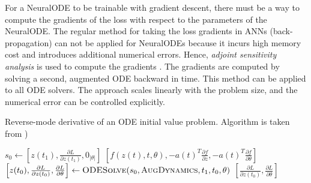 For a \gls{NeuralODE} to be trainable with gradient descent, there must be a way to compute the gradients of the loss with respect to the parameters of the \gls{NeuralODE}.
The regular method for taking the loss gradients in \glspl{ANN} (back-propagation) can not be applied for \glspl{NeuralODE} because it incurs high memory cost and introduces additional numerical errors.
Hence, \textit{adjoint sensitivity analysis} is used to compute the gradients \cite{chenNeuralOrdinaryDifferential2019}.
The gradients are computed by solving a second, augmented \gls{ODE} backward in time.
This method can be applied to all \gls{ODE} solvers.
The approach scales linearly with the problem size, and the numerical error can be controlled explicitly.

\begin{algorithm}[h]
    \caption{Reverse-mode derivative of an ODE initial value problem. Algorithm is taken from \cite{chenNeuralOrdinaryDifferential2019})}
    \label{alg:neural-ode-reverse-mode-diff}
    \begin{algorithmic}
            \State $s_0 \gets \left[z(t_1), \frac{\partial L}{\partial z(t_1)}, 0_{|\theta|}\right]$
                \State \Return $\left[f(z(t), t, \theta), -a(t)^T\frac{\partial f}{\partial z}, -a(t)^T\frac{\partial f}{\partial \theta}\right]$
            \EndFunction
            \State $\left[z(t_0), \frac{\partial L}{\partial z(t_0)}, \frac{\partial L}{\partial \theta}\right] \gets \Call{ODESolve}{s_0, \textproc{AugDynamics}, t_1, t_0, \theta}$
            \State \Return $\left[\frac{\partial L}{\partial z(t_0)}, \frac{\partial L}{\partial \theta}\right]$
        \EndFunction
    \end{algorithmic}
\end{algorithm}

